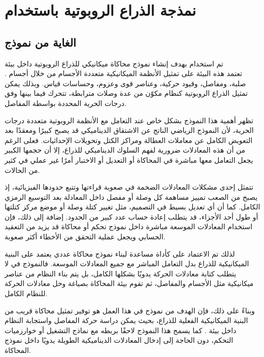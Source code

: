 \section{نمذجة الذراع الروبوتية باستخدام }

\subsection{الغاية من نموذج }

تم استخدام   بهدف إنشاء نموذج محاكاة ميكانيكي للذراع الروبوتية داخل بيئة \\. تعتمد هذه البيئة على تمثيل الأنظمة الميكانيكية متعددة الأجسام من خلال أجسام صلبة، ومفاصل، وقيود حركية، وعناصر قوى وعزوم، وحساسات قياس. وبذلك يمكن تمثيل الذراع الروبوتية كنظام مكوّن من عدة وصلات مترابطة، تتحرك فيما بينها وفق درجات الحرية المحددة بواسطة المفاصل.

تظهر أهمية هذا النموذج بشكل خاص عند التعامل مع الأنظمة الروبوتية متعددة درجات الحرية، لأن النموذج الرياضي الناتج عن الاشتقاق الديناميكي قد يصبح كبيرًا ومعقدًا بعد التعويض الكامل عن معاملات العطالة ومراكز الكتل وتحويلات الإحداثيات. فعلى الرغم من أن هذه المعادلات ضرورية لفهم السلوك الديناميكي للذراع، إلا أن حجمها الكبير يجعل التعامل معها مباشرة في المحاكاة أو التعديل أو الاختبار أمرًا غير عملي في كثير من الحالات.

تتمثل إحدى مشكلات المعادلات الضخمة في صعوبة قراءتها وتتبع حدودها الفيزيائية، إذ يصبح من الصعب تمييز مساهمة كل وصلة أو مفصل داخل المعادلة بعد التوسيع الرمزي الكامل. كما أن أي تعديل بسيط في التصميم، مثل تغيير كتلة وصلة أو موضع مركز كتلتها أو طول أحد الأجزاء، قد يتطلب إعادة حساب عدد كبير من الحدود. إضافة إلى ذلك، فإن استخدام المعادلات الموسعة مباشرة داخل نموذج تحكم أو محاكاة قد يزيد من التعقيد الحسابي ويجعل عملية التحقق من الأخطاء أكثر صعوبة.

لذلك تم الاعتماد على  كأداة مساعدة لبناء نموذج محاكاة عددي يعتمد على البنية الميكانيكية للذراع بدل التعامل المباشر مع جميع المعادلات الموسعة. فالنموذج في  لا يتطلب كتابة معادلات الحركة يدويًا بشكلها الكامل، بل يتم بناء النظام من عناصر ميكانيكية مثل الأجسام والمفاصل، ثم تقوم بيئة المحاكاة بصياغة وحل معادلات الحركة للنظام الكامل.

وبناءً على ذلك، فإن الهدف من نموذج  في هذا العمل هو توفير تمثيل محاكاة قريب من البنية الميكانيكية الفعلية للذراع، بحيث يمكن دراسة حركة المفاصل واستجابة النظام داخل بيئة . كما يسمح هذا النموذج لاحقًا بربطه مع نماذج التشغيل أو خوارزميات التحكم، دون الحاجة إلى إدخال المعادلات الديناميكية الطويلة يدويًا داخل نموذج المحاكاة.







